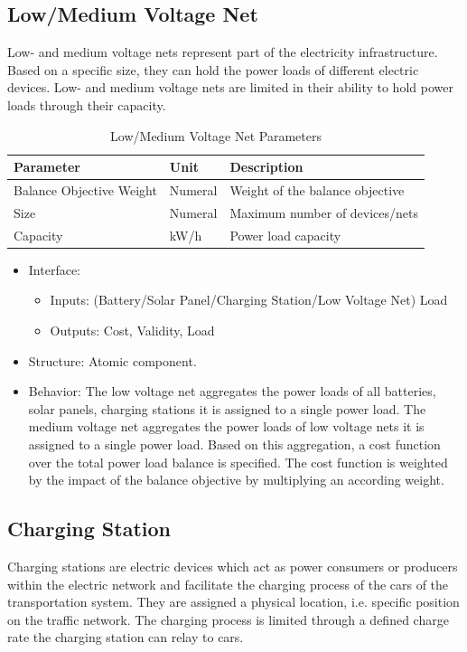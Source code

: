 \subsection{Low/Medium Voltage Net}

Low- and medium voltage nets represent part of the electricity infrastructure. Based on a specific size, they can hold the power loads of different electric devices. Low- and medium voltage nets are limited in their ability to hold power loads through their capacity.

\begin{table}[h]
	\renewcommand{\arraystretch}{1.3}
	\caption{Low/Medium Voltage Net Parameters}
	\centering
	\begin{tabular}{lll}
		\hline
		\textbf{Parameter}                    & \textbf{Unit} & \textbf{Description} \\ \hline
		Balance Objective Weight       & Numeral    & Weight of the balance objective  \\  
		Size                  	  & Numeral    & Maximum number of devices/nets      \\
		Capacity          & kW/h    & Power load capacity      \\ \hline
	\end{tabular}
\end{table}

\begin{itemize}
	\item Interface: 
	\begin{itemize}
		\item Inputs: (Battery/Solar Panel/Charging Station/Low Voltage Net) Load
		\item Outputs: Cost, Validity, Load
	\end{itemize}	
	\item Structure: Atomic component.
	\item Behavior: The low voltage net aggregates the power loads of all batteries, solar panels, charging stations it is assigned to a single power load. The medium voltage net aggregates the power loads of low voltage nets it is assigned to a single power load. Based on this aggregation, a cost function over the total power load balance is specified. The cost function is weighted by the impact of the balance objective by multiplying an according weight.
	
\end{itemize}

\subsection{Charging Station}
Charging stations are electric devices which act as power consumers or producers within the electric network and facilitate the charging process of the cars of the transportation system. They are assigned a physical location, i.e. specific position on the traffic network. The charging process is limited through a defined charge rate the charging station can relay to cars.

